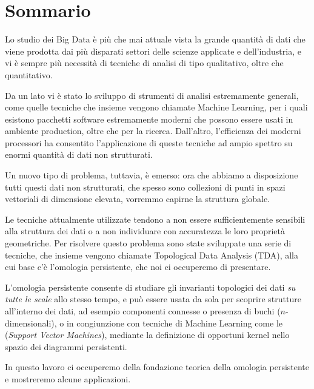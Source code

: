 \begingroup
\let\clearpage\relax
\let\cleardoublepage\relax
\let\cleardoublepage\relax

\chapter*{Sommario}

Lo studio dei Big Data è più che mai attuale vista la grande quantità di dati che viene prodotta dai più disparati settori delle scienze applicate e dell'industria, e vi è sempre più necessità di tecniche di analisi di tipo qualitativo, oltre che quantitativo.

Da un lato vi è stato lo sviluppo di strumenti di analisi estremamente generali, come quelle tecniche che insieme vengono chiamate Machine Learning, per i quali esistono pacchetti software estremamente moderni che possono essere usati in ambiente production, oltre che per la ricerca. Dall'altro, l'efficienza dei moderni processori ha consentito l'applicazione di queste tecniche ad ampio spettro su enormi quantità di dati non strutturati.

Un nuovo tipo di problema, tuttavia, è emerso: ora che abbiamo a disposizione tutti questi dati non strutturati, che spesso sono collezioni di punti in spazi vettoriali di dimensione elevata, vorremmo capirne la struttura globale.

Le tecniche attualmente utilizzate tendono a non essere sufficientemente sensibili alla struttura dei dati o a non individuare con accuratezza le loro proprietà geometriche. Per risolvere questo problema sono state sviluppate una serie di tecniche, che insieme vengono chiamate Topological Data Analysis (TDA), alla cui base c'è l'omologia persistente, che noi ci occuperemo di presentare.

L'omologia persistente consente di studiare gli invarianti topologici dei dati \emph{su tutte le scale} allo stesso tempo, e può essere usata da sola per scoprire strutture all'interno dei dati, ad esempio componenti connesse o presenza di buchi ($n$-dimensionali), o in congiunzione con tecniche di Machine Learning come le (\emph{Support Vector Machines}), mediante la definizione di opportuni kernel nello spazio dei diagrammi persistenti.

In questo lavoro ci occuperemo della fondazione teorica della omologia persistente e mostreremo alcune applicazioni.

\vfill

\endgroup

\vfill
